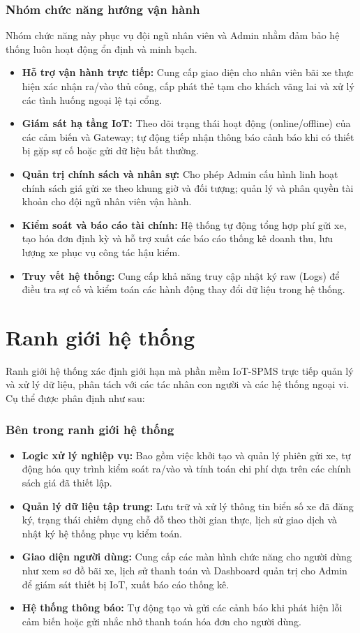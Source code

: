 \documentclass[a4paper,12pt]{article}
\begin{document}
\subsubsection{Nhóm chức năng hướng vận hành}
Nhóm chức năng này phục vụ đội ngũ nhân viên và Admin nhằm đảm bảo hệ thống luôn hoạt động ổn định và minh bạch.
\begin{itemize}
    \item \textbf{Hỗ trợ vận hành trực tiếp:} Cung cấp giao diện cho nhân viên bãi xe thực hiện xác nhận ra/vào thủ công, cấp phát thẻ tạm cho khách vãng lai và xử lý các tình huống ngoại lệ tại cổng.
    \item \textbf{Giám sát hạ tầng IoT:} Theo dõi trạng thái hoạt động (online/offline) của các cảm biến và Gateway; tự động tiếp nhận thông báo cảnh báo khi có thiết bị gặp sự cố hoặc gửi dữ liệu bất thường.
    \item \textbf{Quản trị chính sách và nhân sự:} Cho phép Admin cấu hình linh hoạt chính sách giá gửi xe theo khung giờ và đối tượng; quản lý và phân quyền tài khoản cho đội ngũ nhân viên vận hành.
    \item \textbf{Kiểm soát và báo cáo tài chính:} Hệ thống tự động tổng hợp phí gửi xe, tạo hóa đơn định kỳ và hỗ trợ xuất các báo cáo thống kê doanh thu, lưu lượng xe phục vụ công tác hậu kiểm.
    \item \textbf{Truy vết hệ thống:} Cung cấp khả năng truy cập nhật ký raw (Logs) để điều tra sự cố và kiểm toán các hành động thay đổi dữ liệu trong hệ thống.
\end{itemize}



\section{Ranh giới hệ thống}
Ranh giới hệ thống xác định giới hạn mà phần mềm IoT-SPMS trực tiếp quản lý và xử lý dữ liệu, phân tách với các tác nhân con người và các hệ thống ngoại vi. Cụ thể được phân định như sau:

\subsubsection{Bên trong ranh giới hệ thống}
\begin{itemize}
    \item \textbf{Logic xử lý nghiệp vụ:} Bao gồm việc khởi tạo và quản lý phiên gửi xe, tự động hóa quy trình kiểm soát ra/vào và tính toán chi phí dựa trên các chính sách giá đã thiết lập.
    \item \textbf{Quản lý dữ liệu tập trung:} Lưu trữ và xử lý thông tin biển số xe đã đăng ký, trạng thái chiếm dụng chỗ đỗ theo thời gian thực, lịch sử giao dịch và nhật ký hệ thống phục vụ kiểm toán.
    \item \textbf{Giao diện người dùng:} Cung cấp các màn hình chức năng cho người dùng như xem sơ đồ bãi xe, lịch sử thanh toán và Dashboard quản trị cho Admin để giám sát thiết bị IoT, xuất báo cáo thống kê.
    \item \textbf{Hệ thống thông báo:} Tự động tạo và gửi các cảnh báo khi phát hiện lỗi cảm biến hoặc gửi nhắc nhở thanh toán hóa đơn cho người dùng.
\end{itemize}
\end{document}
